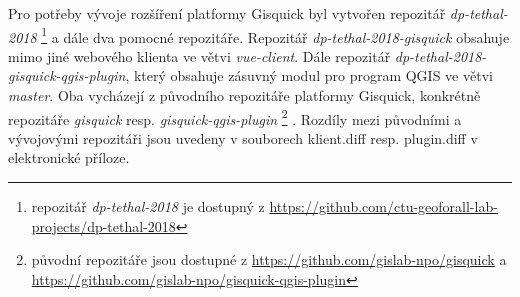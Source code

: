 \newpage
Pro potřeby vývoje rozšíření platformy Gisquick byl vytvořen repozitář 
\textit{dp-tethal-2018}
\footnote{repozitář \textit{dp-tethal-2018} je dostupný z \newline \url{https://github.com/ctu-geoforall-lab-projects/dp-tethal-2018}}
 a dále dva pomocné repozitáře. 
Repozitář \textit{dp-tethal-2018-gisquick}
obsahuje mimo jiné webového klienta ve větvi \textit{vue-client}.
Dále repozitář \textit{dp-tethal-2018-gisquick-qgis-plugin}, který obsahuje zásuvný 
modul pro program QGIS ve větvi \textit{master}.
Oba vycházejí z původního repozitáře platformy Gisquick, konkrétně 
repozitáře \textit{gisquick} resp. \textit{gisquick-qgis-plugin}
\footnote{původní repozitáře jsou dostupné z \url{https://github.com/gislab-npo/gisquick} a \newline \url{https://github.com/gislab-npo/gisquick-qgis-plugin}}
.
\newline
Rozdíly mezi původními a vývojovými repozitáři jsou uvedeny v 
souborech klient.diff resp. plugin.diff v elektronické příloze. 

